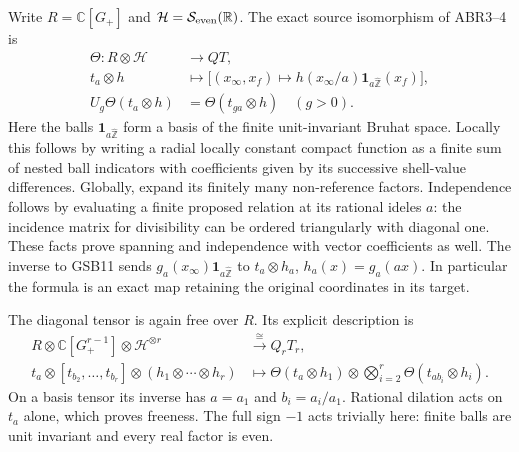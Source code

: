 Write $R=\mathbb C[G_+]$ and $\mathcal H=\mathcal S_{\rm even}(\mathbb R)$.
The exact source isomorphism of ABR3--4 is
\begin{equation}\tag{GSB11}
\begin{split}
\Theta:R\otimes\mathcal H&\longrightarrow QT,\\
t_a\otimes h&\longmapsto
  \bigl[(x_\infty,x_f)\longmapsto
           h(x_\infty/a)\mathbf1_{a\widehat{\mathbb Z}}(x_f)\bigr],\\
U_g\Theta(t_a\otimes h)&=\Theta(t_{ga}\otimes h)\quad(g>0).
\end{split}
\end{equation}
Here the balls $\mathbf1_{a\widehat{\mathbb Z}}$ form a basis of
the finite unit-invariant Bruhat space. Locally this follows by
writing a radial locally constant compact function as a finite
sum of nested ball indicators with coefficients given by its
successive shell-value differences. Globally, expand its finitely
many non-reference factors. Independence follows by evaluating a
finite proposed relation at its rational ideles $a$: the incidence
matrix for divisibility can be ordered triangularly with diagonal
one. These facts prove spanning and independence with vector
coefficients as well. The inverse to GSB11 sends
$g_a(x_\infty)\mathbf1_{a\widehat{\mathbb Z}}$ to
$t_a\otimes h_a$, $h_a(x)=g_a(ax)$. In particular the formula is
an exact map retaining the original coordinates in its target.

The diagonal tensor is again free over $R$. Its explicit description is
\begin{equation}\tag{GSB12}
\begin{split}
R\otimes\mathbb C[G_+^{r-1}]\otimes\mathcal H^{\otimes r}
 &\xrightarrow{\ \cong\ }Q_rT_r,\\
t_a\otimes[t_{b_2},\ldots,t_{b_r}]\otimes
       (h_1\otimes\cdots\otimes h_r)
 &\longmapsto\Theta(t_a\otimes h_1)\otimes
       \bigotimes_{i=2}^r\Theta(t_{ab_i}\otimes h_i).
\end{split}
\end{equation}
On a basis tensor its inverse has $a=a_1$ and $b_i=a_i/a_1$.
Rational dilation acts on $t_a$ alone, which proves freeness.
The full sign $-1$ acts trivially here: finite balls are unit
invariant and every real factor is even.


